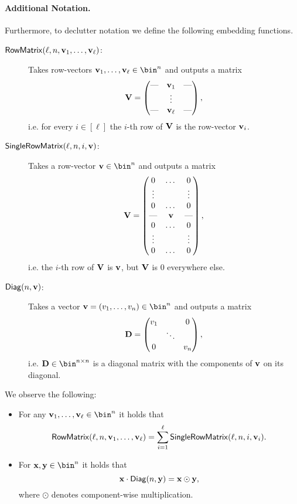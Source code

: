 \paragraph{Additional Notation.} Furthermore, to declutter notation we define the following embedding functions.
\begin{description}
\item[$\mathsf{RowMatrix}(\ell,n,\mathbf{v}_1,\dots,\mathbf{v}_\ell)$:] Takes row-vectors $\vc{v}_1,\dots,\vc{v}_\ell \in \bin^n$ and outputs a matrix
\[
\mathbf{V} = \left(\begin{matrix}\text{---} & \mathbf{v}_1 & \text{---} \\ &\vdots& \\ \text{---} & \mathbf{v}_\ell & \text{---} \end{matrix}\right),
\]
i.e. for every $i \in [\ell]$ the $i$-th row of $\mathbf{V}$ is the row-vector $\mathbf{v}_i$.

\item[$\mathsf{SingleRowMatrix}(\ell,n,i,\mathbf{v})$:] Takes a row-vector $\vc{v} \in \bin^n$ and outputs a matrix
\[
\mathbf{V} = \left(\begin{matrix} 0 & \dots & 0 \\ \vdots & & \vdots \\ 0 & \dots & 0 \\ \text{---} & \mathbf{v} & \text{---} \\ 0 & \dots & 0 \\ \vdots & & \vdots \\ 0 & \dots & 0 \end{matrix}\right),
\]
i.e. the $i$-th row of $\mathbf{V}$ is $\mathbf{v}$, but $\mathbf{V}$ is 0 everywhere else.

\item[$\mathsf{Diag}(n,\mathbf{v})$:] Takes a vector $\vc{v} = (v_1,\dots,v_n) \in \bin^n$ and outputs a matrix
\[
\mathbf{D} = \left( \begin{matrix} v_1 & & 0 \\
    & \ddots &  \\
    0 & & v_n\end{matrix}\right),
\]
i.e. $\vc{D} \in \bin^{n \times n}$ is a diagonal matrix with the components of $\mathbf{v}$ on its diagonal.
\end{description}

We observe the following:
\begin{itemize}
    \item For any $\vc{v}_1,\dots,\vc{v}_\ell \in \bin^n$ it holds that
    \[
    \mathsf{RowMatrix}(\ell,n,\mathbf{v}_1,\dots,\mathbf{v}_\ell) = \sum_{i = 1}^\ell \mathsf{SingleRowMatrix}(\ell,n,i,\mathbf{v}_i).
    \]
    \item For $\vc{x},\vc{y} \in \bin^n$ it holds that
    \[
    \mathbf{x} \cdot \mathsf{Diag}(n,\mathbf{y}) = \mathbf{x} \odot \mathbf{y},
    \]
    where $\odot$ denotes component-wise multiplication.
\end{itemize}


